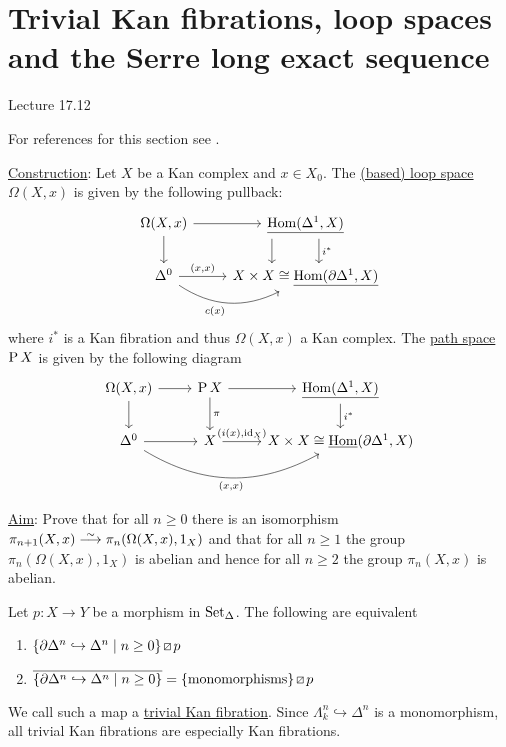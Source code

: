 \section{Trivial Kan fibrations, loop spaces and the Serre long exact sequence}

Lecture 17.12

For references for this section see \cite[Section I.7]{GoerSimp1999}.

\underline{Construction}:
Let $X$ be a Kan complex and $x \in X_0$.
The \underline{(based) loop space} $\Omega(X,x)$ is given by the following pullback:
\[
\begin{tikzcd}
    \Omega(X,x)
    \ar[r]
    \ar[d]
    &
    \underline{\Hom(\Delta^1, X)}
    \ar[d, shift left=4, "i^*"]
    \ar[d, shift right=10]
    \\
    \Delta^0
    \ar[r, "{(x,x)}"]
    \ar[r, bend right, "c(x)"']
    &
    X\times X \cong \underline{\Hom(\partial \Delta^1 , X)}
\end{tikzcd}
\]
where $i^*$ is a Kan fibration and thus $\Omega(X,x)$ a Kan complex.
The \underline{path space} $\operatorname{P} X$ is given by the following diagram 
\[
\begin{tikzcd}
    \Omega(X,x) 
    \ar[d]
    \ar[r]
    &
    \Pathspace X
    \ar[r]
    \ar[d, "\pi"]
    &
    \underline{\Hom (\Delta^1,X)}
    \ar[d, "i^*"]
    \\
    \Delta^0
    \ar[rr, bend right, "{(x,x)}"']
    \ar[r]
    &
    X
    \ar[r,"{(i(x), \id_X)}"]
    &
    X \times X
    \cong 
    \underline{\Hom}(\partial \Delta^1, X)
\end{tikzcd}
\]

\underline{Aim}: Prove that for all $n \geq 0$ there is an isomorphism $\pi_{n+1}(X,x) \isomorphism \pi_n ( \Omega(X,x), 1_X)$ and that for all $n \geq 1$ the group $\pi_n(\Omega(X,x),1_X)$ is abelian and hence for all $n \geq 2$ the group $\pi_n(X,x)$ is abelian.
\begin{defi/prop}
\label{trivial_Kan_fibration}
    Let $p\colon X \to Y$ be a morphism in $\operatorname{Set}_{\Delta}$. The following are equivalent 
    \begin{enumerate}
        \item 
        $\{ \partial\Delta^n \hookrightarrow \Delta^n \mid n \geq 0 \} \lift{} p$
        \item 
        $\overline{\{ \partial\Delta^n \hookrightarrow \Delta^n \mid n  \geq 0\}} = \{\text{monomorphisms}\} \lift{} p$
    \end{enumerate}
    We call such a map a \underline{trivial Kan fibration}.
    Since $\Lambda_k^n \hookrightarrow \Delta^n$ is a monomorphism, all trivial Kan fibrations are especially Kan fibrations.
\end{defi/prop}

